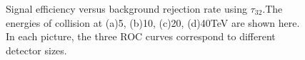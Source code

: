 \documentclass[final,1p,11pt]{elsarticle}
\begin{document}
\begin{figure}
\begin{center}
\end{center}
\caption{Signal efficiency versus background rejection rate using $\tau_{32}$.The energies of collision at (a)5, (b)10, (c)20, (d)40TeV are shown here. In each picture, the three ROC curves correspond to different detector sizes.}
\label{fig:cluster_tau32}
\end{figure}
\end{document}
